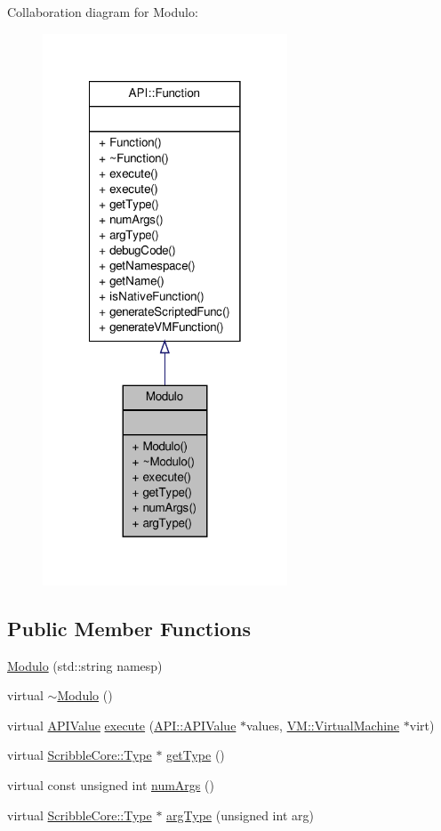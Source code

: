 Collaboration diagram for Modulo\-:
\nopagebreak
\begin{figure}[H]
\begin{center}
\leavevmode
\includegraphics[width=206pt]{class_modulo__coll__graph}
\end{center}
\end{figure}
\subsection*{Public Member Functions}
\begin{DoxyCompactItemize}
\item 
\hyperlink{class_modulo_ad8569ce14030d2947e15aa012be5043f}{Modulo} (std\-::string namesp)
\item 
virtual \hyperlink{class_modulo_a8461196a9b9a9dbe2ee75a7f263d49e2}{$\sim$\-Modulo} ()
\item 
virtual \hyperlink{class_a_p_i_1_1_a_p_i_value}{A\-P\-I\-Value} \hyperlink{class_modulo_aaed393a98ec1434a75e8d16ca2a01fc2}{execute} (\hyperlink{class_a_p_i_1_1_a_p_i_value}{A\-P\-I\-::\-A\-P\-I\-Value} $\ast$values, \hyperlink{class_v_m_1_1_virtual_machine}{V\-M\-::\-Virtual\-Machine} $\ast$virt)
\item 
virtual \hyperlink{class_scribble_core_1_1_type}{Scribble\-Core\-::\-Type} $\ast$ \hyperlink{class_modulo_acab773160bb5bfc25ab13de8dbf9a132}{get\-Type} ()
\item 
virtual const unsigned int \hyperlink{class_modulo_abf49f63e3d3896ebb50c1f6bdf1bc698}{num\-Args} ()
\item 
virtual \hyperlink{class_scribble_core_1_1_type}{Scribble\-Core\-::\-Type} $\ast$ \hyperlink{class_modulo_a4b50580aa3465a4ba193e8fa462244d8}{arg\-Type} (unsigned int arg)
\end{DoxyCompactItemize}
